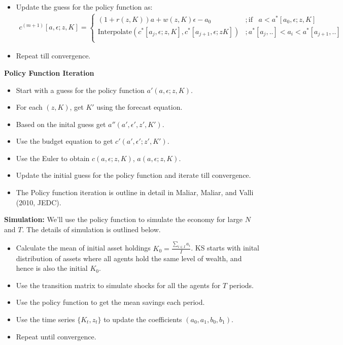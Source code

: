 \documentclass[12pt]{article}
\begin{document}
\begin{enumerate}
\begin{itemize}
\item Update the guess for the policy function as:
\begin{align*}
c^{(m+1)}[a, \epsilon; z, K]= 
\begin{cases}
(1+r(z, K))a + w(z, K)\epsilon - a_0 & ; \text{if} \; \; \;  a < a^*[a_0, \epsilon; z, K] \\
\text{Interpolate} (c^*[a_j, \epsilon; z, K], c^*[a_{j+1}, \epsilon; z K]) &;  a^*[a_j, ..] < a_i < a^*[a_{j+1}, ..] \\
\end{cases}
\end{align*}
\item Repeat till convergence.
\end{itemize}

\textbf{Policy Function Iteration}
\begin{itemize}
\item Start with a guess for the policy function $a'(a, \epsilon; z, K)$.
\item For each $(z, K)$, get $K'$ using the forecast equation.
\item Based on the inital guess get $a''(a', \epsilon', z', K')$.
\item Use the budget equation to get $c'(a', \epsilon'; z', K').$
\item Use the Euler to obtain $c(a, \epsilon; z, K)$, $a(a, \epsilon; z, K)$.
\item Update the initial guess for the policy function and iterate till convergence.
\item The Policy function iteration is outline in detail in Maliar, Maliar, and Valli (2010, JEDC).
\end{itemize}
\end{enumerate}

\item \textbf{Simulation:} We'll use the policy function to simulate the economy for large $N$ and $T$. The details of simulation is outlined below.
\begin{itemize}
\item Calculate the mean of initial asset holdings $K_0 = \frac{\sum_{i \in I} a_i}{I}$. KS starts with inital distribution of assets where all agents hold the same level of wealth, and hence is also the initial $K_0$.
\item Use the transition matrix to simulate shocks for all the agents for $T$ periods.
\item Use the policy function to get the mean savings each period.
\item Use the time series $\{K_t, z_t\}$ to update the coefficients $(a_0, a_1, b_0, b_1)$.
\item Repeat until convergence.
\end{itemize}
\end{document}

